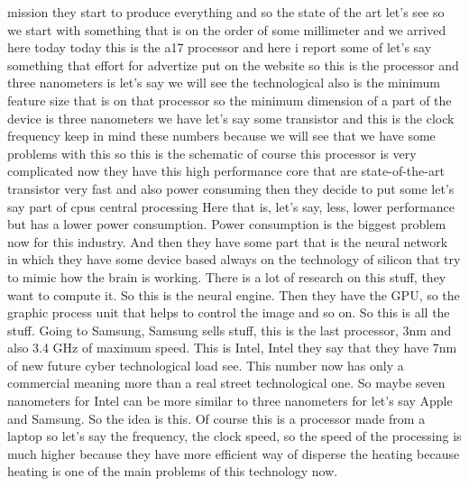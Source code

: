 mission they start to produce everything and so the state of the art let's see so we start with something that is on the order of some millimeter and we arrived here today today this is the a17 processor and here i report some of let's say something that effort for advertize put on the website so this is the processor and three nanometers is let's say we will see the technological also is the minimum feature size that is on that processor so the minimum dimension of a part of the device is three nanometers we have let's say some transistor and this is the clock frequency keep in mind these numbers because we will see that we have some problems with this so this is the schematic of course this processor is very complicated now they have this high performance core that are state-of-the-art transistor very fast and also power consuming then they decide to put some let's say part of cpus central processing Here that is, let's say, less, lower performance but has a lower power consumption. Power consumption is the biggest problem now for this industry. And then they have some part that is the neural network in which they have some device based always on the technology of silicon that try to mimic how the brain is working. There is a lot of research on this stuff, they want to compute it. So this is the neural engine. Then they have the GPU, so the graphic process unit that helps to control the image and so on. So this is all the stuff. Going to Samsung, Samsung sells stuff, this is the last processor, 3nm and also 3.4 GHz of maximum speed. This is Intel, Intel they say that they have 7nm of new future cyber technological load see. This number now has only a commercial meaning more than a real street technological one. So maybe seven nanometers for Intel can be more similar to three nanometers for let's say Apple and Samsung. So the idea is this. Of course this is a processor made from a laptop so let's say the frequency, the clock speed, so the speed of the processing is much higher because they have more efficient way of disperse the heating because heating is one of the main problems of this technology now.
